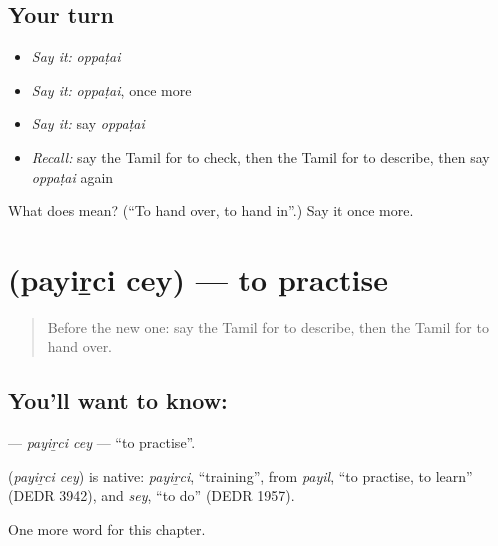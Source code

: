 \subsection*{Your turn}
\begin{itemize}
\raggedright
  \item \emph{Say it:} \emph{oppaṭai}
  \item \emph{Say it:} \emph{oppaṭai}, once more
  \item \emph{Say it:} say \emph{oppaṭai}
  \item \emph{Recall:} say the Tamil for to check, then the Tamil for to describe, then say \emph{oppaṭai} again
\end{itemize}

\begin{tcolorbox}[breakable,colback=teal!4,colframe=teal!35!black,title={Before you move on}]
What does  mean? (\textquotedblleft{}To hand over, to hand in\textquotedblright{}.) Say it once more.
\end{tcolorbox}
\section[\texorpdfstring{\ta{பயிற்சி} \ta{செய்} (payiṟci cey)}{பயிற்சி செய் (payiṟci cey)}]{  (payiṟci cey) — to practise}

\label{lesson:TA-C164-payirci-cey}



\begin{quote}
Before the new one: say the Tamil for to describe, then the Tamil for to hand over.
\end{quote}

\subsection*{You'll want to know:  }
\textbf{ } — \emph{payiṟci cey} — \textquotedblleft{}to practise\textquotedblright{}.

\begin{cousinweb}
\textbf{ } (\emph{payiṟci cey}) is native: \emph{payiṟci}, \textquotedblleft{}training\textquotedblright{}, from \emph{payil}, \textquotedblleft{}to practise, to learn\textquotedblright{} (DEDR 3942), and \emph{sey}, \textquotedblleft{}to do\textquotedblright{} (DEDR 1957).
\end{cousinweb}

\begin{grammarlens}[title={What you've built}]
One more word for this chapter.
\end{grammarlens}

